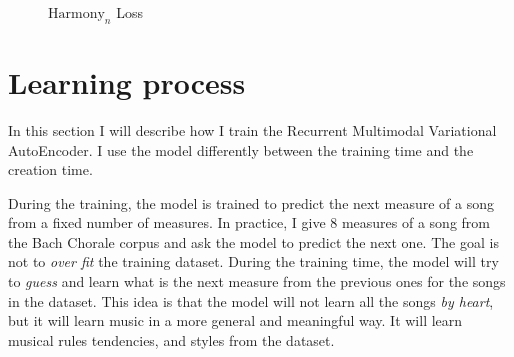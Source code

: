 \documentclass[12pt]{report}
\begin{document}
\begin{figure}[htbp]
\begin{minipage}{0.5\textwidth}
\begin{center}
        \end{center}
        \caption{$\text{Harmony}_n$ Loss}
        \label{fig:loss_harmony_n}
    \end{minipage}
\end{figure}

\section{Learning process}
\label{sec:learning-process}


In this section I will describe how I train the Recurrent Multimodal Variational AutoEncoder.
I use the model differently between the training time and the creation time.

During the training, the model is trained to predict the next measure of a song from a fixed number of measures.
In practice, I give 8 measures of a song from the Bach Chorale corpus and ask the model to predict the next one.
The goal is not to \textit{over fit} the training dataset.
During the training time, the model will try to \textit{guess} and learn what is the next measure from the previous ones for the songs in the dataset.
This idea is that the model will not learn all the songs \textit{by heart}, but it will learn music in a more general and meaningful way.
It will learn musical rules tendencies, and styles from the dataset.
\end{document}
